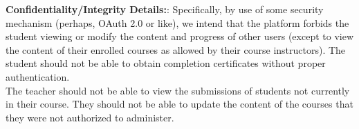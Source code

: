 \documentclass[11pt]{article}
\begin{document}
\textbf{Confidentiality/Integrity Details:}: Specifically, by use of some security mechanism (perhaps, OAuth 2.0 or like), we intend that the platform forbids the student viewing or modify the content and progress of other users (except to view the content of their enrolled courses as allowed by their course instructors). The student should not be able to obtain completion certificates without proper authentication.\\

The teacher should not be able to view the submissions of students not currently in their course. They should not be able to update the content of the courses that they were not authorized to administer.\\
\end{document}

